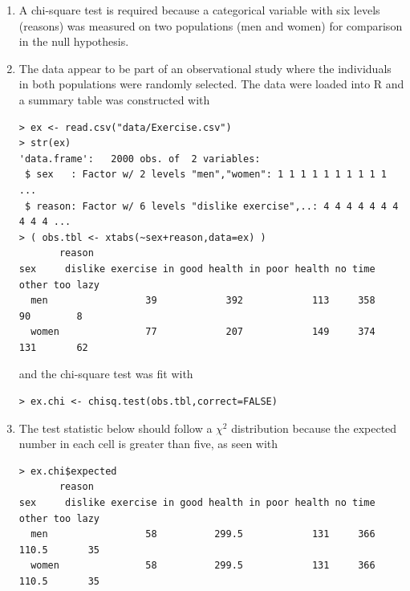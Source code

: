 \documentclass[10pt,openany]{book}\usepackage[]{graphicx}\usepackage[]{color}
\makeatletter
\newenvironment{kframe}{%
 \def\at@end@of@kframe{}%
 \ifinner\ifhmode%
  \def\at@end@of@kframe{\end{minipage}}%
  \begin{minipage}{\columnwidth}%
 \fi\fi%
 \def\FrameCommand##1{\hskip\@totalleftmargin \hskip-\fboxsep
 \colorbox{shadecolor}{##1}\hskip-\fboxsep
     \hskip-\linewidth \hskip-\@totalleftmargin \hskip\columnwidth}%
 \MakeFramed {\advance\hsize-\width
   \@totalleftmargin\z@ \linewidth\hsize
   \@setminipage}}%
 {\par\unskip\endMakeFramed%
 \at@end@of@kframe}
\newenvironment{knitrout}{}{} %
\makeatother
\begin{document}
\begin{itemize}
\begin{enumerate}
      \item A chi-square test is required because a categorical variable with six levels (reasons) was measured on two populations (men and women) for comparison in the null hypothesis.
      \item The data appear to be part of an observational study where the individuals in both populations were randomly selected.  The data were loaded into R and a summary table was constructed with
\begin{knitrout}
\color{fgcolor}\begin{kframe}
\begin{verbatim}
> ex <- read.csv("data/Exercise.csv")
> str(ex)
'data.frame':	2000 obs. of  2 variables:
 $ sex   : Factor w/ 2 levels "men","women": 1 1 1 1 1 1 1 1 1 1 ...
 $ reason: Factor w/ 6 levels "dislike exercise",..: 4 4 4 4 4 4 4 4 4 4 ...
> ( obs.tbl <- xtabs(~sex+reason,data=ex) )
       reason
sex     dislike exercise in good health in poor health no time other too lazy
  men                 39            392            113     358    90        8
  women               77            207            149     374   131       62
\end{verbatim}
\end{kframe}
\end{knitrout}
and the chi-square test was fit with
\begin{knitrout}
\color{fgcolor}\begin{kframe}
\begin{verbatim}
> ex.chi <- chisq.test(obs.tbl,correct=FALSE)
\end{verbatim}
\end{kframe}
\end{knitrout}
      \item The test statistic below should follow a $\chi^{2}$ distribution because the expected number in each cell is greater than five, as seen with
\begin{knitrout}
\color{fgcolor}\begin{kframe}
\begin{verbatim}
> ex.chi$expected
       reason
sex     dislike exercise in good health in poor health no time other too lazy
  men                 58          299.5            131     366 110.5       35
  women               58          299.5            131     366 110.5       35
\end{verbatim}

\end{kframe}
\end{knitrout}
\end{enumerate}
\end{itemize}
\end{document}
